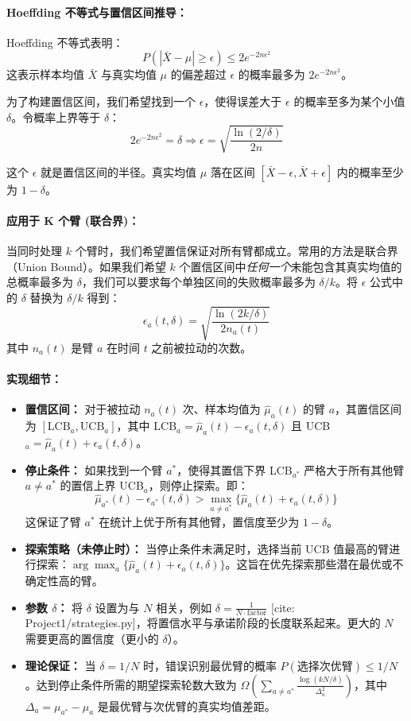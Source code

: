 \documentclass[6pt, a4paper]{ctexart} %
\begin{document}
\paragraph{Hoeffding 不等式与置信区间推导：}
Hoeffding 不等式表明：
$$P(|\bar{X} - \mu| \ge \epsilon) \le 2e^{-2n\epsilon^2}$$
这表示样本均值 $\bar{X}$ 与真实均值 $\mu$ 的偏差超过 $\epsilon$ 的概率最多为 $2e^{-2n\epsilon^2}$。

为了构建置信区间，我们希望找到一个 $\epsilon$，使得误差大于 $\epsilon$ 的概率至多为某个小值 $\delta$。令概率上界等于 $\delta$：
$$2e^{-2n\epsilon^2} = \delta\Rightarrow \displaystyle\epsilon= \sqrt{\frac{\ln(2/\delta)}{2n}}$$

这个 $\epsilon$ 就是置信区间的半径。真实均值 $\mu$ 落在区间 $[\bar{X} - \epsilon, \bar{X} + \epsilon]$ 内的概率至少为 $1-\delta$。

\paragraph{应用于 K 个臂 (联合界)：}
当同时处理 $k$ 个臂时，我们希望置信保证对所有臂都成立。常用的方法是联合界（Union Bound）。如果我们希望 $k$ 个置信区间中\emph{任何一个}未能包含其真实均值的总概率最多为 $\delta$，我们可以要求每个单独区间的失败概率最多为 $\delta/k$。将 $\epsilon$ 公式中的 $\delta$ 替换为 $\delta/k$ 得到：
$$\epsilon_a(t, \delta) = \sqrt{\frac{\ln(2k/\delta)}{2n_a(t)}}$$
其中 $n_a(t)$ 是臂 $a$ 在时间 $t$ 之前被拉动的次数。
\paragraph{实现细节：}
\begin{itemize}
    \item \textbf{置信区间：} 对于被拉动 $n_a(t)$ 次、样本均值为 $\hat{\mu}_a(t)$ 的臂 $a$，其置信区间为 $[\text{LCB}_a, \text{UCB}_a]$，其中 LCB$_a = \hat{\mu}_a(t) - \epsilon_a(t, \delta)$ 且 UCB$_a = \hat{\mu}_a(t) + \epsilon_a(t, \delta)$。
    \item \textbf{停止条件：} 如果找到一个臂 $a^*$，使得其置信下界 LCB$_{a^*}$ 严格大于所有其他臂 $a \neq a^*$ 的置信上界 UCB$_a$，则停止探索。即：
    $$\hat{\mu}_{a^*}(t) - \epsilon_{a^*}(t, \delta) > \max_{a \neq a^*} \{ \hat{\mu}_a(t) + \epsilon_a(t, \delta) \}$$
    这保证了臂 $a^*$ 在统计上优于所有其他臂，置信度至少为 $1-\delta$。
    \item \textbf{探索策略（未停止时）：} 当停止条件未满足时，选择当前 UCB 值最高的臂进行探索：$\arg\max_a \{\hat{\mu}_a(t) + \epsilon_a(t, \delta)\}$。这旨在优先探索那些潜在最优或不确定性高的臂。
    \item \textbf{参数 $\delta$：} 将 $\delta$ 设置为与 $N$ 相关，例如 $\delta = \frac{1}{N \cdot \text{factor}}$ [cite: Project1/strategies.py]，将置信水平与承诺阶段的长度联系起来。更大的 $N$ 需要更高的置信度（更小的 $\delta$）。
    \item \textbf{理论保证：} 当 $\delta=1/N$ 时，错误识别最优臂的概率 $P(\text{选择次优臂}) \le 1/N$。达到停止条件所需的期望探索轮数大致为 $\Omega(\sum_{a \neq a^*} \frac{\log(kN/\delta)}{\Delta_a^2})$，其中 $\Delta_a = \mu_{a^*} - \mu_a$ 是最优臂与次优臂的真实均值差距。
\end{itemize}
\end{document}

